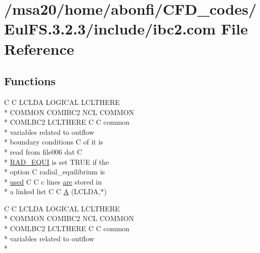 \hypertarget{msa20_2home_2abonfi_2_c_f_d__codes_2_eul_f_s_83_82_83_2include_2ibc2_8com}{\section{/msa20/home/abonfi/\-C\-F\-D\-\_\-codes/\-Eul\-F\-S.3.2.3/include/ibc2.com File Reference}
\label{msa20_2home_2abonfi_2_c_f_d__codes_2_eul_f_s_83_82_83_2include_2ibc2_8com}
}
\subsection*{Functions}
\begin{DoxyCompactItemize}
\item 
C C L\-C\-L\-D\-A L\-O\-G\-I\-C\-A\-L L\-C\-L\-T\-H\-E\-R\-E \\*
C\-O\-M\-M\-O\-N C\-O\-M\-I\-B\-C2 N\-C\-L C\-O\-M\-M\-O\-N \\*
C\-O\-M\-L\-B\-C2 L\-C\-L\-T\-H\-E\-R\-E C C common \\*
variables related to outflow \\*
boundary conditions C of it is \\*
read from file006 dat C \\*
\hyperlink{msa20_2home_2abonfi_2_c_f_d__codes_2_eul_f_s_83_82_83_2include_2ibc2_8com_a5e52771773c3d7155ccec9942c9d7d87}{R\-A\-D\-\_\-\-E\-Q\-U\-I} is set T\-R\-U\-E if the \\*
option C radial\-\_\-equilibrium is \\*
\hyperlink{msa20_2home_2abonfi_2_c_f_d__codes_2_eul_f_s_83_82_83_2include_2stream_8com_a3291a21585d0aec360cd82d75bf51496}{used} C C c lines \hyperlink{msa20_2home_2abonfi_2_c_f_d__codes_2_eul_f_s_83_82_83_2include_2ibc8_8com_a7f7721a0bb3c1d35cfbfbcfd6efc1548}{are} stored in \\*
a linked list C C \hyperlink{msa20_2home_2abonfi_2_c_f_d__codes_2_eul_f_s_83_82_83_2include_2ibc2_8com_ad2108d58343608772fff791c23da58f5}{A} (L\-C\-L\-D\-A,$\ast$)
\item 
C C L\-C\-L\-D\-A L\-O\-G\-I\-C\-A\-L L\-C\-L\-T\-H\-E\-R\-E \\*
C\-O\-M\-M\-O\-N C\-O\-M\-I\-B\-C2 N\-C\-L C\-O\-M\-M\-O\-N \\*
C\-O\-M\-L\-B\-C2 L\-C\-L\-T\-H\-E\-R\-E C C common \\*
variables related to outflow \\*

\end{DoxyCompactItemize}
